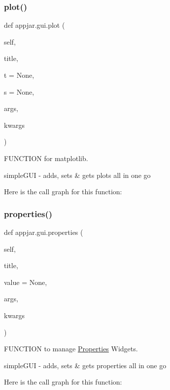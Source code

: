 \begin{DoxyVerb}
\subsubsection{\texorpdfstring{plot()}{plot()}}
{\footnotesize\ttfamily def appjar.\+gui.\+plot (\begin{DoxyParamCaption}\item[{}]{self,  }\item[{}]{title,  }\item[{}]{t = {\ttfamily None},  }\item[{}]{s = {\ttfamily None},  }\item[{}]{args,  }\item[{}]{kwargs }\end{DoxyParamCaption})}



F\+U\+N\+C\+T\+I\+ON for matplotlib. 

\begin{DoxyVerb}simpleGUI - adds, sets & gets plots all in one go \end{DoxyVerb}
 Here is the call graph for this function\+:
\mbox{\label{classappjar_1_1gui_ae489640bfdf71c1217541d0dc5f77344}} 
\subsubsection{\texorpdfstring{properties()}{properties()}}
{\footnotesize\ttfamily def appjar.\+gui.\+properties (\begin{DoxyParamCaption}\item[{}]{self,  }\item[{}]{title,  }\item[{}]{value = {\ttfamily None},  }\item[{}]{args,  }\item[{}]{kwargs }\end{DoxyParamCaption})}



F\+U\+N\+C\+T\+I\+ON to manage \hyperlink{classappjar_1_1_properties}{Properties} Widgets. 

\begin{DoxyVerb}simpleGUI - adds, sets & gets properties all in one go \end{DoxyVerb}
 Here is the call graph for this function\+:
\mbox{\label{classappjar_1_1gui_a4e49b2e9ac6a35cb037ddf685a28692e}} 

\end{DoxyVerb}
